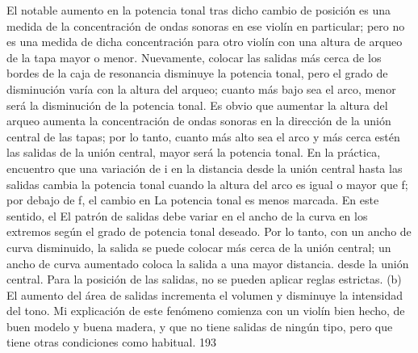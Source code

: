 El notable aumento en la potencia tonal tras dicho cambio de posición es una medida de la concentración de ondas sonoras en ese violín en particular; pero no es una medida de dicha concentración para otro violín con una altura de arqueo de la tapa mayor o menor. Nuevamente, colocar las salidas más cerca de los bordes de la caja de resonancia disminuye la potencia tonal, pero el grado de disminución varía con la altura del arqueo; cuanto más bajo sea el arco, menor será la disminución de la potencia tonal. Es obvio que aumentar la altura del arqueo aumenta la concentración de ondas sonoras en la dirección de la unión central de las tapas; por lo tanto, cuanto más alto sea el arco y más cerca estén las salidas de la unión central, mayor será la potencia tonal. En la práctica, encuentro que una variación de i en la distancia desde la unión central hasta las salidas cambia la potencia tonal cuando la altura del arco es igual o mayor que f; por debajo de f, el cambio en
La potencia tonal es menos marcada. En este sentido, el
El patrón de salidas debe variar en el ancho de la curva en los extremos según el grado de potencia tonal deseado. Por lo tanto, con un ancho de curva disminuido, la salida se puede colocar más cerca de la unión central; un ancho de curva aumentado coloca la salida a una mayor distancia.
desde la unión central. Para la posición de las salidas, no se pueden aplicar reglas estrictas.
(b) El aumento del área de salidas incrementa el volumen y disminuye la intensidad del tono. Mi explicación de este fenómeno comienza con un violín bien hecho, de buen modelo y buena madera, y que no tiene salidas de ningún tipo, pero que tiene otras condiciones como
habitual. 193

